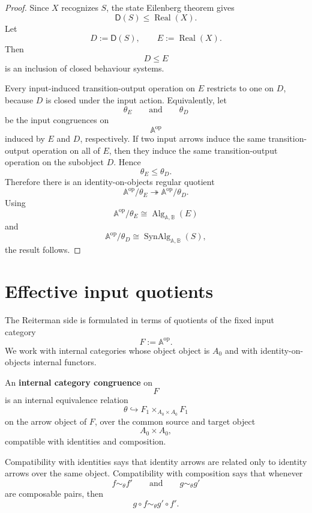 \begin{proof}
Since \(X\) recognizes \(S\), the state Eilenberg theorem gives
\[
\mathsf D(S)\leq\operatorname{Real}(X).
\]
Let
\[
D:=\mathsf D(S),
\qquad
E:=\operatorname{Real}(X).
\]
Then
\[
D\leq E
\]
is an inclusion of closed behaviour systems.

Every input-induced transition-output operation on \(E\) restricts to one on
\(D\), because \(D\) is closed under the input action. Equivalently, let
\[
\theta_E
\qquad\text{and}\qquad
\theta_D
\]
be the input congruences on
\[
\mathbb A^{\mathrm{op}}
\]
induced by \(E\) and \(D\), respectively. If two input arrows induce the same
transition-output operation on all of \(E\), then they induce the same
transition-output operation on the subobject \(D\). Hence
\[
\theta_E\leq\theta_D.
\]
Therefore there is an identity-on-objects regular quotient
\[
\mathbb A^{\mathrm{op}}/\theta_E
\twoheadrightarrow
\mathbb A^{\mathrm{op}}/\theta_D.
\]
Using
\[
\mathbb A^{\mathrm{op}}/\theta_E
\cong
\operatorname{Alg}_{\mathbb A,\mathbb B}(E)
\]
and
\[
\mathbb A^{\mathrm{op}}/\theta_D
\cong
\operatorname{SynAlg}_{\mathbb A,\mathbb B}(S),
\]
the result follows.
\end{proof}

\section{Effective input quotients}
\label{sec:reiterman-effective-input-quotients}

The Reiterman side is formulated in terms of quotients of the fixed input
category
\[
F:=\mathbb A^{\mathrm{op}}.
\]
We work with internal categories whose object object is \(A_0\) and with
identity-on-objects internal functors.

\begin{definition}
\label{def:reiterman-internal-category-congruence}
An \textbf{internal category congruence} on
\[
F
\]
is an internal equivalence relation
\[
\theta\hookrightarrow
F_1\times_{A_0\times A_0}F_1
\]
on the arrow object of \(F\), over the common source and target object
\[
A_0\times A_0,
\]
compatible with identities and composition.

Compatibility with identities says that identity arrows are related only to
identity arrows over the same object. Compatibility with composition says
that whenever
\[
f\sim_\theta f'
\qquad\text{and}\qquad
g\sim_\theta g'
\]
are composable pairs, then
\[
g\circ f\sim_\theta g'\circ f'.
\]
\end{definition}

